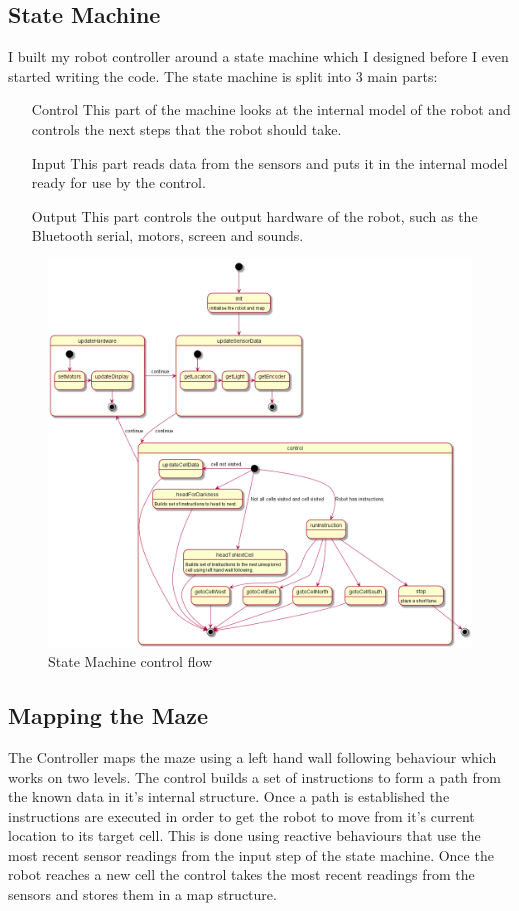 \documentclass[11pt,a4paper,titlepage]{article}
\begin{document}
        \subsection{State Machine}
            I built my robot controller around a state machine which I designed before I even started writing the code.
            The state machine is split into 3 main parts:
            \begin{itemize}
                \item[Control] This part of the machine looks at the internal model of the robot and controls the next steps that the robot should take.
                \item[Input] This part reads data from the sensors and puts it in the internal model ready for use by the control.
                \item[Output] This part controls the output hardware of the robot, such as the Bluetooth serial, motors, screen and sounds.
            \end{itemize} 
            \begin{figure}[H]
                \caption{State Machine control flow}
                \includegraphics[width=17cm,keepaspectratio]{stateDiagram}
            \end{figure}
        \subsection{Mapping the Maze}
            The Controller maps the maze using a left hand wall following behaviour which works on two levels. 
            The control builds a set of instructions to form a path from the known data in it's internal structure. 
            Once a path is established the instructions are executed in order to get the robot to move from it's current location to its target cell. 
            This is done using reactive behaviours that use the most recent sensor readings from the input step of the state machine.
            Once the robot reaches a new cell the control takes the most recent readings from the sensors and stores them in a map structure. 
\end{document}
